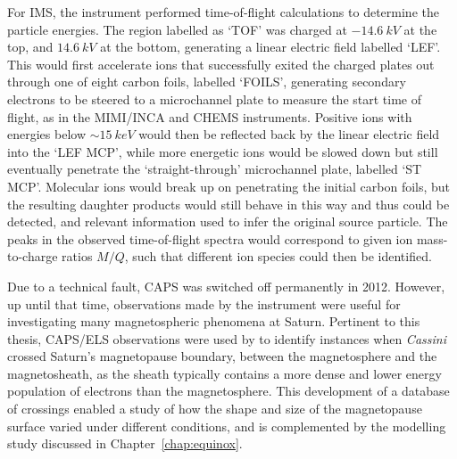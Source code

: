 For IMS, the instrument performed time-of-flight calculations to determine the particle energies. The region labelled as `TOF' was charged at $\SI{-14.6}{kV}$ at the top, and $\SI{+14.6}{kV}$ at the bottom, generating a linear electric field labelled `LEF'. This would first accelerate ions that successfully exited the charged plates out through one of eight carbon foils, labelled `FOILS', generating secondary electrons to be steered to a microchannel plate to measure the start time of flight, as in the MIMI/INCA and CHEMS instruments. Positive ions with energies below ${\sim}\SI{15}{keV}$ would then be reflected back by the linear electric field into the `LEF MCP', while more energetic ions would be slowed down but still eventually penetrate the `straight-through' microchannel plate, labelled `ST MCP'. Molecular ions would break up on penetrating the initial carbon foils, but the resulting daughter products would still behave in this way and thus could be detected, and relevant information used to infer the original source particle. The peaks in the observed time-of-flight spectra would correspond to given ion mass-to-charge ratios $M/Q$, such that different ion species could then be identified.

Due to a technical fault, CAPS was switched off permanently in 2012. However, up until that time, observations made by the instrument were useful for investigating many magnetospheric phenomena at Saturn. Pertinent to this thesis, CAPS/ELS observations were used by \citet{pilkington2015} to identify instances when \textit{Cassini} crossed Saturn's magnetopause boundary, between the magnetosphere and the magnetosheath, as the sheath typically contains a more dense and lower energy population of electrons than the magnetosphere. This development of a database of crossings enabled a study of how the shape and size of the magnetopause surface varied under different conditions, and is complemented by the modelling study discussed in Chapter~\ref{chap:equinox}.



